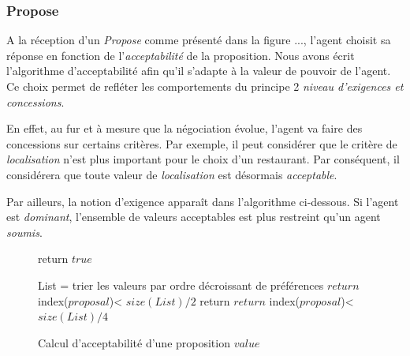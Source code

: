 	\subsubsection{Propose}
	A la réception d'un \emph{Propose} comme présenté dans la figure ..., l'agent choisit sa réponse en fonction de l'\emph{acceptabilité} de la proposition.
	Nous avons écrit l'algorithme d'acceptabilité afin qu'il s'adapte à la valeur de pouvoir de l'agent. Ce choix permet de refléter les comportements du principe 2 \emph{niveau d'exigences et concessions}.
	
	En effet, au fur et à mesure que la négociation évolue, l'agent va faire des concessions sur certains critères. Par exemple, il peut considérer que le critère de \emph{localisation} n'est plus important pour le choix d'un restaurant. Par conséquent, il considérera que toute valeur de \emph{localisation} est désormais \emph{acceptable}.
	
	Par ailleurs, la notion d'exigence apparaît dans l'algorithme ci-dessous. Si l'agent est \emph{dominant}, l'ensemble de valeurs acceptables est plus restreint qu'un agent \emph{soumis}.
	
	\begin{figure}[]
		\begin{algorithmic}[1]\small
			\State return $true$
			\EndIf
			
			\State List = trier les valeurs par ordre décroissant de préférences
			\State $return$ index($proposal$)< $size(List)/2$
			\EndIf
			\State return $return$ index($proposal$)< $size(List)/4$
			\EndIf
			\EndFunction
		\end{algorithmic}
		\vskip 8pt
		\label{pseudo}
		\caption{Calcul d'acceptabilité d'une proposition $value$}
	\end{figure} 
	

